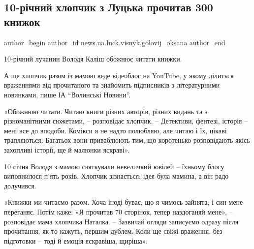  
 
 
 
 
 
\subsection{10-річний хлопчик з Луцька прочитав 300 книжок}
\label{sec:23_01_2022.stz.news.ua.luck.visnyk.1.malchik_300_knigi_chtenie}
 
\ifcmt
 author_begin
   author_id news.ua.luck.visnyk,golovij_oksana
 author_end
\fi

10-річний лучанин Володя Каліш обожнює читати книжки. 

А ще хлопчик разом із мамою веде відеоблог на YouTube, у якому ділиться
враженнями від прочитаного та знайомить підписників з літературними новинками,
пише ІА \enquote{Волинські Новини}. 


«Обожнюю читати. Читаю книги різних авторів, різних видань та з різноманітними
сюжетами, – розповідає хлопчик. – Детективи, фентезі, історія – мені все до
вподоби. Комікси я не надто полюбляю, але читаю і їх, цікаві трапляються.
Багатьох вони приваблюють тим, що коротенько розповідають якісь захопливі
історії, ще й малюнки яскраві».

10 січня Володя з мамою святкували невеличкий ювілей – їхньому блогу
виповнилося п’ять років. Хлопчик зізнається: ідея була мамина, а він радо
долучився.


«Книжки ми читаємо разом. Хоча іноді буває, що я чимось зайнята, і син мене
переганяє. Потім каже: «Я прочитав 70 сторінок, тепер наздоганяй мене», –
розповідає мама хлопчика Наталка. – Зазвичай огляди записуємо одразу після
прочитання, як то кажуть, першим дублем. Коли ще свіжі враження, без підготовки
– тоді й емоція яскравіша, щиріша».

